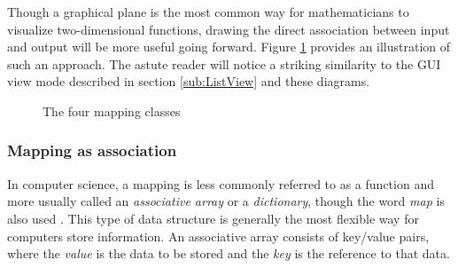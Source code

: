 Though a graphical plane is the most common way for mathematicians to visualize two-dimensional functions, drawing the direct association between input and output will be more useful going forward. Figure \ref{fig:types_of_mapping} provides an illustration of such an approach. The astute reader will notice a striking similarity to the GUI view mode described in section \ref{sub:ListView} and these diagrams.  

\begin{figure}[ht]
\centering
\caption{The four mapping classes}
\label{fig:types_of_mapping}
\end{figure}

	\subsubsection{Mapping as association}

In computer science, a mapping is less commonly referred to as a function and more usually called an \emph{associative array} or a \emph{dictionary}, though the word \emph{map} is also used \cite{data_structures}. This type of data structure is generally the most flexible way for computers store information. An associative array consists of key/value pairs, where the \emph{value} is the data to be stored and the \emph{key} is the reference to that data. 

